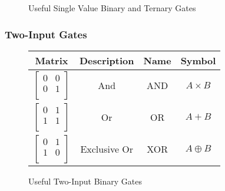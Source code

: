 \documentclass[12pt]{article}
\begin{document}
\begin{figure}[h]
\begin{tabular}{c|c|c|c}
    \end{tabular}
    \caption{Useful Single Value Binary and Ternary Gates}
    \label{fig:single_value_tern_gates}
\end{figure}

\subsubsection{Two-Input Gates}

\begin{figure}[h]
    \centering
    \begin{tabular}{c|c|c|c}
        Matrix & Description & Name & Symbol \\
        \hline
        $\begin{bmatrix}0 & 0 \\ 0 & 1 \\\end{bmatrix}$ & And & AND & $A \times B$ \\
        $\begin{bmatrix}0 & 1 \\ 1 & 1 \\\end{bmatrix}$ & Or & OR & $A + B$ \\
        $\begin{bmatrix}0 & 1 \\ 1 & 0 \\\end{bmatrix}$ & Exclusive Or & XOR & $A \oplus B$ \\
    \end{tabular}
    \caption{Useful Two-Input Binary Gates}
    \label{fig:two_value_bin_gates}
\end{figure}
\end{document}
